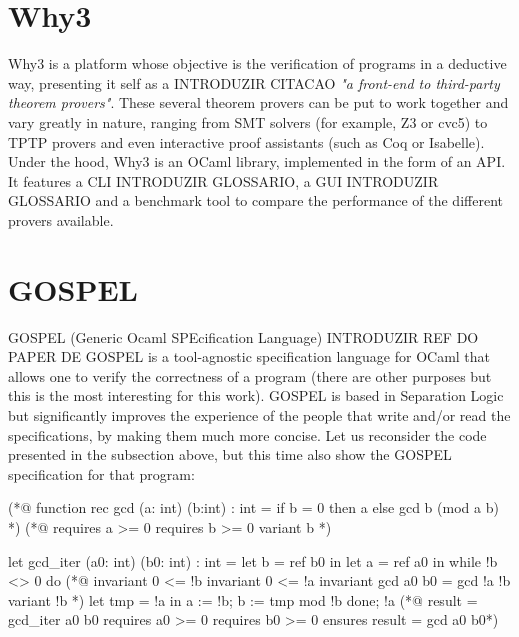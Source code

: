 \section{Why3}
\label{sec:why3}

Why3 is a platform whose objective is the verification of programs in a deductive way, presenting it self as a INTRODUZIR CITACAO \emph{"a front-end to third-party theorem provers"}.
These several theorem provers can be put to work together and vary greatly in nature, ranging from SMT solvers (for example, Z3 or cvc5) to TPTP provers and even interactive proof assistants (such as Coq or Isabelle).
Under the hood, Why3 is an OCaml library, implemented in the form of an API.
It features a CLI INTRODUZIR GLOSSARIO, a GUI INTRODUZIR GLOSSARIO and a benchmark tool to compare the performance of the different provers available.


\section{GOSPEL}
\label{sec:gospel}

GOSPEL (Generic Ocaml SPEcification Language) INTRODUZIR REF DO PAPER DE GOSPEL is a tool-agnostic specification language for OCaml that allows one to verify the correctness of a program (there are other purposes but this is the most interesting for this work).
GOSPEL is based in Separation Logic but significantly improves the experience of the people that write and/or read the specifications, by making them much more concise.
Let us reconsider the code presented in the subsection above, but this time also show the GOSPEL specification for that program:

\begin{gospel}
  (*@ function rec gcd (a: int) (b:int) : int =
      if b = 0 then a
      else gcd b (mod a b) *)
  (*@ requires a >= 0
      requires b >= 0
      variant b *)
\end{gospel}

\begin{gospel}
  let gcd_iter (a0: int) (b0: int) : int =
    let b = ref b0 in
    let a = ref a0 in
    while !b <> 0 do
        (*@ invariant 0 <= !b
            invariant 0 <= !a
            invariant gcd a0 b0 = gcd !a !b
            variant !b *)
        let tmp = !a in
        a := !b;
        b := tmp mod !b
    done;
    !a
  (*@ result = gcd_iter a0 b0
      requires a0 >= 0
      requires b0 >= 0
      ensures result = gcd a0 b0*)
\end{gospel}

